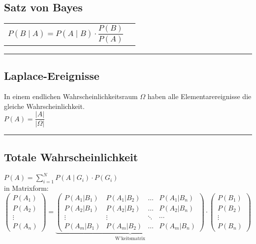 \begin{minipage}{7cm}
\vspace{3mm}
\subsection{Satz von Bayes  }
\begin{tabular}{ll}
  $P(B\mid A)=P(A\mid B) \cdot\dfrac{P(B)}{P(A)}$
  \vspace{1mm}
\end{tabular}
\hrule

\subsection{Laplace-Ereignisse  }
In einem endlichen Wahrscheinlichkeitsraum $\Omega$ haben alle
Elementarereignisse die gleiche Wahrscheinlichkeit. \\
$P(A)=\dfrac{\left| A\right|}{\left|\Omega\right|}$ \\
\hrule

\end{minipage}
\hspace{5mm}
\begin{minipage}{12cm}
\subsection{Totale Wahrscheinlichkeit  }
	$P(A)=\sum\limits_{i=1}^N P(A\mid G_i)\cdot P(G_i)$ \\
	
	in Matrixform: \\
	$\begin{pmatrix}P(A_1)\\P(A_2)\\\vdots\\P(A_n)\end{pmatrix} = 
	\underbrace{\begin{pmatrix}P(A_1|B_1) & P(A_1|B_2) & \ldots & P(A_1|B_n) \\
	P(A_2|B_1) & P(A_2|B_2) & \ldots & P(A_2|B_n) \\
	\vdots & \vdots & \ddots & \cdots \\
	P(A_m|B_1) & P(A_m|B_2) & \ldots & P(A_m|B_n)\end{pmatrix}}_{\text{W'keitsmatrix}}
	\cdot \begin{pmatrix}P(B_1)\\P(B_2)\\\vdots\\P(B_n)\end{pmatrix}$
\end{minipage}